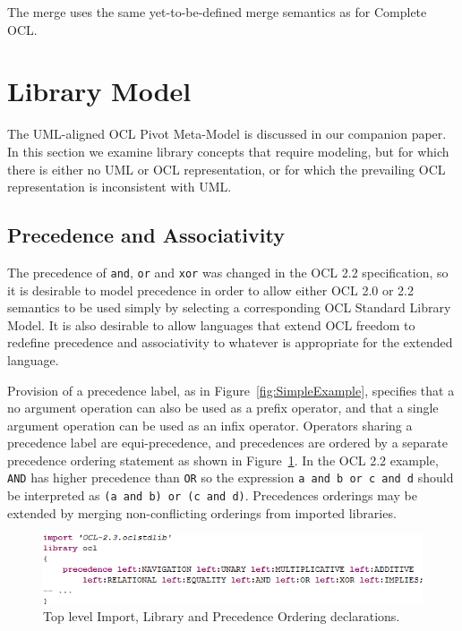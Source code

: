 \documentclass{eceasst}
\begin{document}
The merge uses the same yet-to-be-defined merge semantics as for Complete OCL.

\section{Library Model}\label{LibraryModel}

The UML-aligned OCL Pivot Meta-Model is discussed in our companion paper\cite{OCL-UML}. In this section we examine library concepts that require modeling, but for which there is either no UML or OCL representation, or for which the prevailing OCL representation is inconsistent with UML.

\subsection{Precedence and Associativity}\label{Precedence}

The precedence of \verb|and|, \verb|or| and \verb|xor| was changed in the OCL 2.2 specification, so it is desirable to model precedence in order to allow either OCL 2.0 or 2.2 semantics to be used simply by selecting a corresponding OCL Standard Library Model. It is also desirable to allow languages that extend OCL freedom to redefine precedence and associativity to whatever is appropriate for the extended language.

Provision of a precedence label, as in Figure~\ref{fig:SimpleExample}, specifies that a no argument operation can also be used as a prefix operator, and that a single argument operation can be used as an infix operator. Operators sharing a precedence label are equi-precedence, and precedences are ordered by a separate precedence ordering statement as shown in Figure~\ref{fig:Precedence}. In the OCL 2.2 example, \verb|AND| has higher precedence than \verb|OR| so the expression \verb|a and b or c and d| should be interpreted as \verb|(a and b) or (c and d)|. Precedences orderings may be extended by merging non-conflicting orderings from imported libraries.

\begin{figure}
  \begin{center}
    \includegraphics[width=5.75in]{Precedence.png}
  \end{center}
  \caption{Top level Import, Library and Precedence Ordering declarations.}
  \label{fig:Precedence}
\end{figure}
\end{document}
